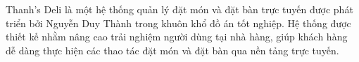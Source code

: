 Thanh's Deli là một hệ thống quản lý đặt món và đặt bàn trực tuyến được phát triển bởi Nguyễn Duy Thành trong khuôn khổ đồ án tốt nghiệp. Hệ thống được thiết kế nhằm nâng cao trải nghiệm người dùng tại nhà hàng, giúp khách hàng dễ dàng thực hiện các thao tác đặt món và đặt bàn qua nền tảng trực tuyến.


